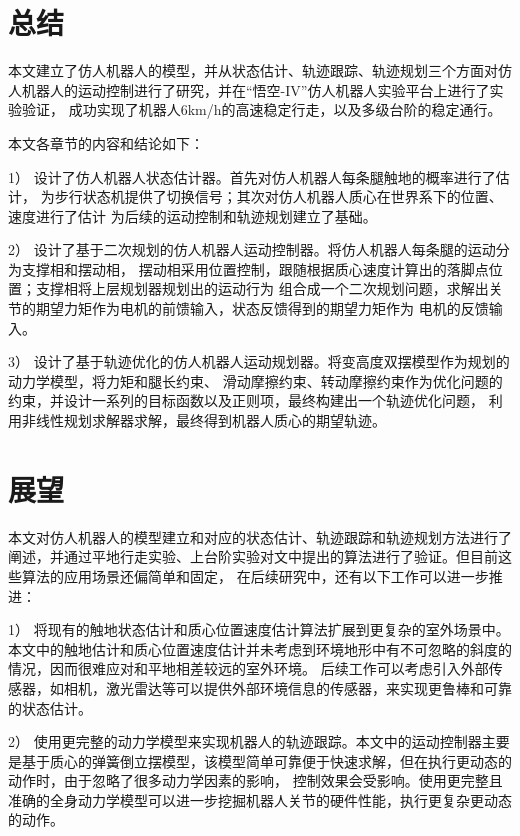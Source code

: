 \section{总结}

本文建立了仿人机器人的模型，并从状态估计、轨迹跟踪、轨迹规划三个方面对仿人机器人的运动控制进行了研究，并在“悟空-IV”仿人机器人实验平台上进行了实验验证，
成功实现了机器人6km/h的高速稳定行走，以及多级台阶的稳定通行。

本文各章节的内容和结论如下：

1） 设计了仿人机器人状态估计器。首先对仿人机器人每条腿触地的概率进行了估计，
为步行状态机提供了切换信号；其次对仿人机器人质心在世界系下的位置、速度进行了估计
为后续的运动控制和轨迹规划建立了基础。

2） 设计了基于二次规划的仿人机器人运动控制器。将仿人机器人每条腿的运动分为支撑相和摆动相，
摆动相采用位置控制，跟随根据质心速度计算出的落脚点位置；支撑相将上层规划器规划出的运动行为
组合成一个二次规划问题，求解出关节的期望力矩作为电机的前馈输入，状态反馈得到的期望力矩作为
电机的反馈输入。

3） 设计了基于轨迹优化的仿人机器人运动规划器。将变高度双摆模型作为规划的动力学模型，将力矩和腿长约束、
滑动摩擦约束、转动摩擦约束作为优化问题的约束，并设计一系列的目标函数以及正则项，最终构建出一个轨迹优化问题，
利用非线性规划求解器求解，最终得到机器人质心的期望轨迹。
\section{展望}

本文对仿人机器人的模型建立和对应的状态估计、轨迹跟踪和轨迹规划方法进行了阐述，并通过平地行走实验、上台阶实验对文中提出的算法进行了验证。但目前这些算法的应用场景还偏简单和固定，
在后续研究中，还有以下工作可以进一步推进：

1） 将现有的触地状态估计和质心位置速度估计算法扩展到更复杂的室外场景中。本文中的触地估计和质心位置速度估计并未考虑到环境地形中有不可忽略的斜度的情况，因而很难应对和平地相差较远的室外环境。
后续工作可以考虑引入外部传感器，如相机，激光雷达等可以提供外部环境信息的传感器，来实现更鲁棒和可靠的状态估计。

2） 使用更完整的动力学模型来实现机器人的轨迹跟踪。本文中的运动控制器主要是基于质心的弹簧倒立摆模型，该模型简单可靠便于快速求解，但在执行更动态的动作时，由于忽略了很多动力学因素的影响，
控制效果会受影响。使用更完整且准确的全身动力学模型可以进一步挖掘机器人关节的硬件性能，执行更复杂更动态的动作。

